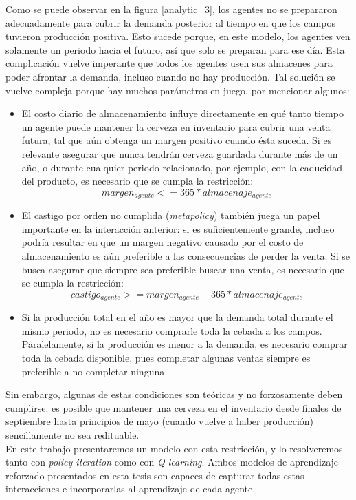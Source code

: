 Como se puede observar en la figura \ref{analytic_3}, los agentes no se prepararon adecuadamente para cubrir la demanda posterior al tiempo en que los campos tuvieron producci\'on positiva. Esto sucede porque, en este modelo, los agentes ven solamente un periodo hacia el futuro, as\'i que solo se preparan para ese d\'ia. Esta complicaci\'on vuelve imperante que todos los agentes usen sus almacenes para poder afrontar la demanda, incluso cuando no hay producci\'on. Tal soluci\'on se vuelve compleja porque hay muchos par\'ametros en juego, por mencionar algunos:
\begin{itemize}
    \item El costo diario de almacenamiento influye directamente en qu\'e tanto tiempo un agente puede mantener la cerveza en inventario para cubrir una venta futura, tal que a\'un obtenga un margen positivo cuando \'esta suceda. Si es relevante asegurar que nunca tendr\'an cerveza guardada durante m\'as de un a\~no, o durante cualquier periodo relacionado, por ejemplo, con la caducidad del producto, es necesario que se cumpla la restricci\'on:
    $$
    margen_{agente} <= 365*almacenaje_{agente}
    $$
    \item El castigo por orden no cumplida (\textit{metapolicy}) tambi\'en juega un papel importante en la interacci\'on anterior: si es suficientemente grande, incluso podr\'ia resultar en que un margen negativo causado por el costo de almacenamiento es a\'un preferible a las consecuencias de perder la venta. Si se busca asegurar que siempre sea preferible buscar una venta, es necesario que se cumpla la restricci\'on:
    $$
    castigo_{agente} >= margen_{agente} + 365*almacenaje_{agente}
    $$
    \item Si la producci\'on total en el a\~no es mayor que la demanda total durante el mismo periodo, no es necesario comprarle toda la cebada a los campos. Paralelamente, si la producci\'on es menor a la demanda, es necesario comprar toda la cebada disponible, pues completar algunas ventas siempre es preferible a no completar ninguna
\end{itemize}

Sin embargo, algunas de estas condiciones son te\'oricas y no forzosamente deben cumplirse: es posible que mantener una cerveza en el inventario desde finales de septiembre hasta principios de mayo (cuando vuelve a haber producci\'on) sencillamente no sea redituable. \\

En este trabajo presentaremos un modelo con esta restricci\'on, y lo resolveremos tanto con \textit{policy iteration} como con \textit{Q-learning}. Ambos modelos de aprendizaje reforzado presentados en esta tesis son capaces de capturar todas estas interacciones e incorporarlas al aprendizaje de cada agente.
